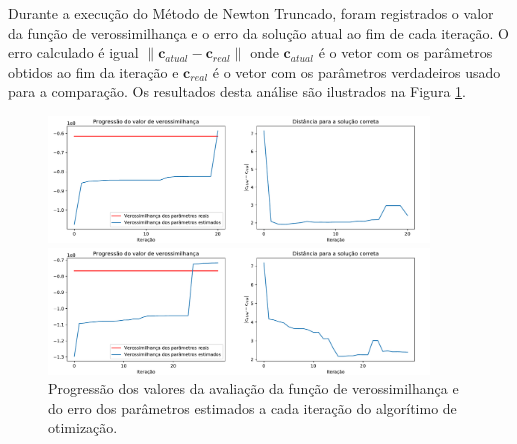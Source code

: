 
Durante a execução do Método de Newton Truncado, foram registrados o valor da função de verossimilhança e o erro da solução atual ao fim de cada iteração.
O erro calculado é igual $\|\mathbf{c}_{atual} - \mathbf{c}_{real}\|$ onde
$\mathbf{c}_{atual}$ é o vetor com os parâmetros obtidos ao fim da iteração e
$\mathbf{c}_{real}$ é o vetor com os parâmetros verdadeiros usado para a comparação.
Os resultados desta análise são ilustrados na Figura \ref{fig:progression_plots}.

\begin{figure}
	\centering
	\caption{Progressão dos valores da avaliação da função de verossimilhança e do erro dos parâmetros estimados a cada iteração do algorítimo de otimização.}
	\label{fig:progression_plots}
	\begin{minipage}[b]{.99\linewidth}
		\centering
		\includegraphics[width=0.90\textwidth]{./figures/results_figures/progression_plot.pdf}
	\end{minipage}

	\begin{minipage}[b]{.99\linewidth}
		\centering
		\includegraphics[width=0.90\textwidth]{./figures/results_figures/progression_plot2.pdf}
	\end{minipage}
\end{figure}

